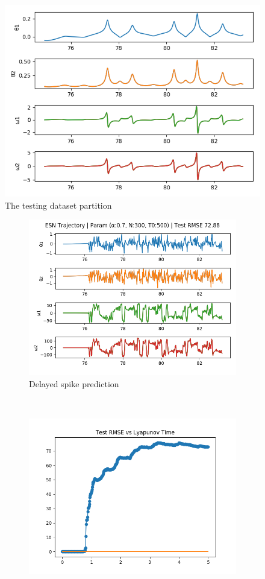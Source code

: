 \documentclass{article}
\begin{document}
\begin{figure}[H]
    \centering
    \includegraphics[width=.5\linewidth]{doc/paper/images/doub_pend/test_data.png}
    \caption{The testing dataset partition}
    \label{fig:doub_pend_testing}
\end{figure}

\begin{figure}[H]
    \centering
    \begin{subfigure}[b]{0.45\textwidth}
        \includegraphics[width=\textwidth]{doc/paper/images/doub_pend/rank_0_param_77_fit.png}
        \caption{Delayed spike prediction}
    \end{subfigure}
    ~
    \begin{subfigure}[b]{0.45\textwidth}
        \includegraphics[width=\textwidth]{doc/paper/images/doub_pend/rank_0_param_77_rmse.png}

\end{subfigure}
\end{figure}
\end{document}
